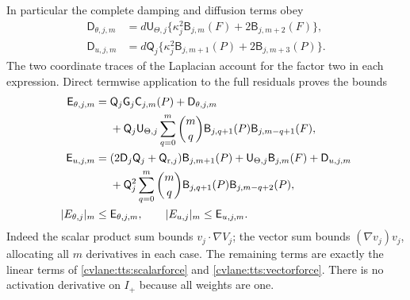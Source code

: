 In particular the complete damping and diffusion terms obey
\begin{align}\label{cvlane:trls:diffusioncost}
 \mathsf D_{\theta,j,m}
 &=d\mathsf U_{\Theta,j}
   \{\mathsf\kappa_j^2\mathsf B_{j,m}(F)
                     +2\mathsf B_{j,m+2}(F)\},\nonumber\\
 \mathsf D_{u,j,m}
 &=d\mathsf Q_j
   \{\mathsf\kappa_j^2\mathsf B_{j,m+1}(P)
                     +2\mathsf B_{j,m+3}(P)\}.
\end{align}
The two coordinate traces of the Laplacian account for the factor
two in each expression. Direct termwise application to the full
residuals proves the bounds
\begin{align}\label{cvlane:trls:forcecost}
 \mathsf E_{\theta,j,m}={}&
 \mathsf Q_j\mathsf G_j\mathsf C_{j,m}(P)
                     +\mathsf D_{\theta,j,m}\nonumber\\
 &+\mathsf Q_j\mathsf U_{\Theta,j}
    \sum_{q=0}^m\binom mq
       \mathsf B_{j,q+1}(P)\mathsf B_{j,m-q+1}(F),\nonumber\\
 \mathsf E_{u,j,m}={}&
 (2\mathsf D_j\mathsf Q_j+\mathsf Q_{{\rm r},j})
                  \mathsf B_{j,m+1}(P)
 +\mathsf U_{\Theta,j}\mathsf B_{j,m}(F)
 +\mathsf D_{u,j,m}\nonumber\\
 &+\mathsf Q_j^2\sum_{q=0}^m\binom mq
       \mathsf B_{j,q+1}(P)\mathsf B_{j,m-q+2}(P),\\
 |E_{\theta,j}|_m\leq{}&\mathsf E_{\theta,j,m},\qquad
 |E_{u,j}|_m\leq\mathsf E_{u,j,m}.\nonumber
\end{align}
Indeed the scalar product sum bounds
$v_j\cdot\nabla V_j$; the vector sum bounds
$(\nabla v_j)v_j$, allocating all $m$ derivatives in
each case. The remaining terms are exactly the linear terms of
\eqref{cvlane:tts:scalarforce} and \eqref{cvlane:tts:vectorforce}.
There is no activation derivative on $I_+$ because all weights
are one.

